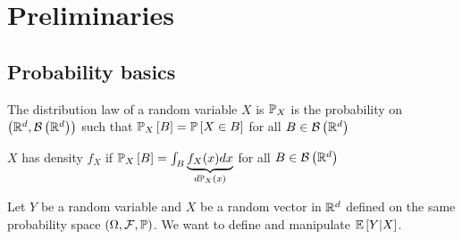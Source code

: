 \section{Preliminaries}
\subsection{Probability basics}
\begin{definition}
    The distribution law of a random variable $X$ is $\mathbb{P}_X$ is the probability on $\left(\mathbb{R}^d,\mathcal{B}\left(\mathbb{R}^d\right)\right)$ such that  $\mathbb{P}_X\left[B\right]=\mathbb{P}\left[X\in B\right]$ for all $B\in \mathcal{B}\left(\mathbb{R}^d\right)$
\end{definition}

\begin{definition}[density]
    $X$ has density $f_X$ if $\mathbb{P}_X\left[B\right]=\int_B \underbrace{f_X(x)dx}_{d\mathbb{P}_X(x)}$ for all $B\in \mathcal{B}\left(\mathbb{R}^d\right)$
\end{definition}

Let $Y$ be a random variable and $X$ be a random vector in $\mathbb{R}^d$ defined on the
same probability space $(\Omega, \mathcal{F}, \mathbb{P})$. We want to define and manipulate
$\mathbb{E}\left[Y|X\right]$.

